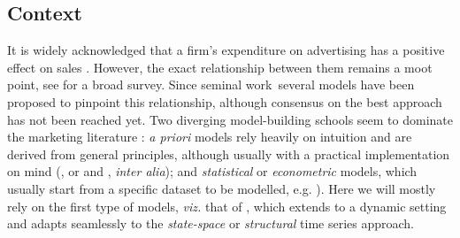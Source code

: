 
\subsection{Context}

It is widely acknowledged that a firm's expenditure  on advertising has a positive effect on sales \parencite{assmus1984advertising, tellis2007advertising, luo2012does, wiesel2011practice}. However, the exact relationship between them remains a moot point, see \parencite{tellis2009generalizations} for a broad survey. Since \textcite{dorfman1954optimal} seminal work\, several models have been proposed to pinpoint this relationship, although consensus on the best approach has not been reached yet. Two diverging model-building schools seem to dominate the marketing literature \parencite{little1979aggregate}: \emph{a priori} models rely heavily on intuition and are derived from general principles, although usually with a practical implementation on mind (\textcite{nerlove1962optimal}, or \textcite{vidale1957operations} and \textcite{little1975brandaid}, \emph{inter alia}); and  \emph{statistical} or \emph{econometric} models, which usually start from a specific dataset to be modelled, e.g. \textcite{assmus1984advertising}). Here we will mostly rely on the first type of models, \emph{viz.} that of \textcite{nerlove1962optimal}, which extends  \textcite{dorfman1954optimal} to a dynamic setting \parencite{bagwell2007economic} and adapts seamlessly to the \emph{state-space} or \emph{structural} time series approach.



